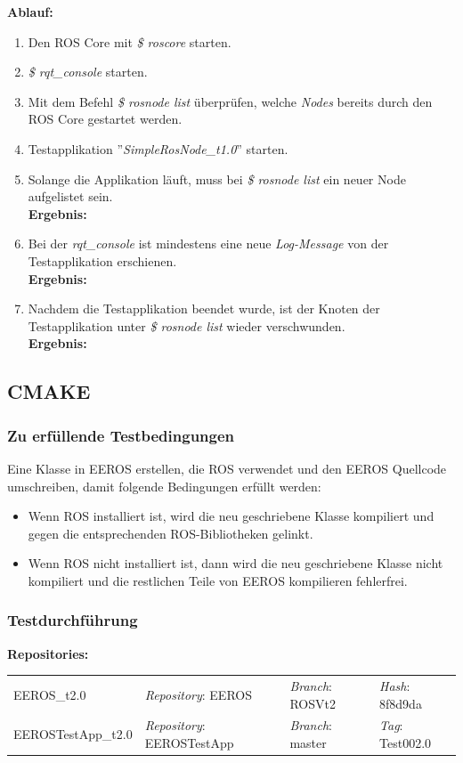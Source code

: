 \textbf{Ablauf: }
\begin{enumerate}
\item Den ROS Core mit \textit{\$ roscore} starten.
\item \textit{\$ rqt\_console} starten.
\item Mit dem Befehl \textit{\$ rosnode list} überprüfen, welche \textit{Nodes} bereits durch den ROS Core gestartet werden. 
\item Testapplikation ''\textit{SimpleRosNode\_t1.0}'' starten.
\item Solange die Applikation läuft, muss bei \textit{\$ rosnode list} ein neuer Node aufgelistet sein. \\
\textbf{Ergebnis:} \checkmark
\item Bei der \textit{rqt\_console} ist mindestens eine neue \textit{Log-Message} von der Testapplikation erschienen. \\
\textbf{Ergebnis:} \checkmark
\item Nachdem die Testapplikation beendet wurde, ist der Knoten der Testapplikation unter \textit{\$ rosnode list} wieder verschwunden. \\
\textbf{Ergebnis:} \checkmark
\end{enumerate}


\subsection{CMAKE}
\subsubsection{Zu erfüllende Testbedingungen}
Eine Klasse in EEROS erstellen, die ROS verwendet und den EEROS Quellcode umschreiben, damit folgende Bedingungen erfüllt werden:
\begin{itemize}
\item Wenn ROS installiert ist, wird die neu geschriebene Klasse kompiliert und gegen die entsprechenden ROS-Bibliotheken gelinkt.
\item Wenn ROS nicht installiert ist, dann wird die neu geschriebene Klasse nicht kompiliert und die restlichen Teile von EEROS kompilieren fehlerfrei.
\end{itemize}

\subsubsection{Testdurchführung}
\textbf{Repositories:} \\
\begin{tabular}
  { l						| l			 							l								 l								}

  EEROS\_t2.0				& \textit{Repository}: EEROS			& \textit{Branch}: ROSVt2		& \textit{Hash}: 8f8d9da		\\
  EEROSTestApp\_t2.0		& \textit{Repository}: EEROSTestApp	& \textit{Branch}: master		& \textit{Tag}: Test002.0 		\\
\end{tabular}


